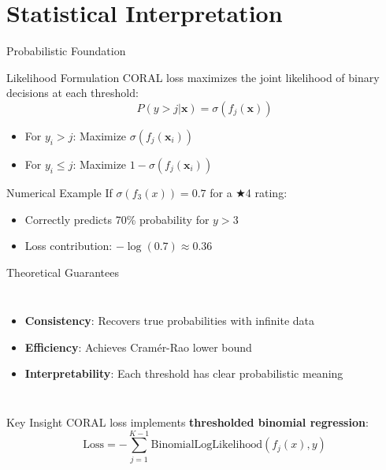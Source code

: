 \documentclass{beamer}
\begin{document}
	\section{Statistical Interpretation} %
	\begin{frame}{Probabilistic Foundation}
		\begin{block}{Likelihood Formulation}
			CORAL loss maximizes the joint likelihood of binary decisions at each threshold:
			\[
			P(y > j | \mathbf{x}) = \sigma(f_j(\mathbf{x}))
			\]
			\begin{itemize}
				\item For $y_i > j$: Maximize $\sigma(f_j(\mathbf{x}_i))$
				\item For $y_i \leq j$: Maximize $1-\sigma(f_j(\mathbf{x}_i))$
			\end{itemize}
		\end{block}
		
		\begin{exampleblock}{Numerical Example}
			If $\sigma(f_3(x)) = 0.7$ for a ★4 rating:
			\begin{itemize}
				\item Correctly predicts 70\% probability for $y > 3$
				\item Loss contribution: $-\log(0.7) \approx 0.36$
			\end{itemize}
		\end{exampleblock}
	\end{frame}
	
	\begin{frame}{Theoretical Guarantees}
		\begin{columns}
			\begin{itemize}
				\item \textbf{Consistency}: Recovers true probabilities with infinite data
				\item \textbf{Efficiency}: Achieves Cramér-Rao lower bound
				\item \textbf{Interpretability}: Each threshold has clear probabilistic meaning
			\end{itemize}
			
		\end{columns}
		
		\vspace{0.5cm}
		\begin{alertblock}{Key Insight}
			CORAL loss implements \textbf{thresholded binomial regression}:
			\[
			\text{Loss} = -\sum_{j=1}^{K-1} \text{BinomialLogLikelihood}(f_j(x), y)
			\]
		\end{alertblock}
	\end{frame}
	
\end{document}
